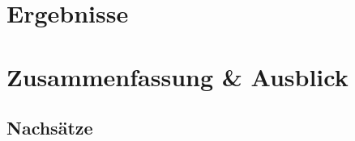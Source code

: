 \documentclass[a4paper,
               final,
               draft,
               11pt]{book}
\begin{document}

\chapter{Ergebnisse}


\chapter{Zusammenfassung \& Ausblick}


\begin{appendix}

\chapter{Nachsätze}


\end{appendix}

\backmatter

\printindex

\begin{sloppypar}
	\printbibliography
\end{sloppypar}

\clearpage
\thispagestyle{empty}



\end{document}
